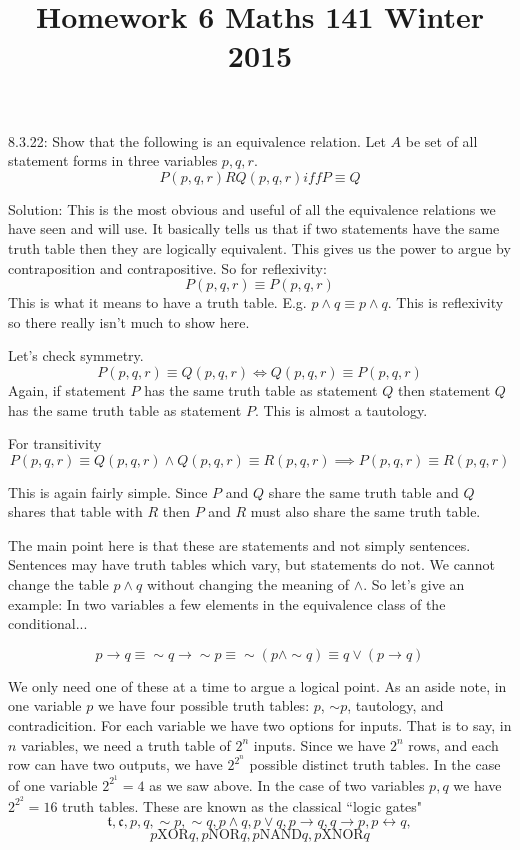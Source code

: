 \documentclass[16 pt]{amsart}
\theoremstyle{definition}
\theoremstyle{remark}
\numberwithin{equation}{subsection}
\begin{document}
\title{Homework 6 Maths 141 Winter 2015}
\maketitle 




8.3.22: Show that the following is an equivalence relation.  Let $A$ be set of all statement forms in three variables $p,q,r.$  
\[
P(p,q,r) R Q(p,q,r) iff P\equiv Q
\]

\vspace{1in}

Solution: This is the most obvious and useful of all the equivalence relations we have seen and will use.  It basically tells us that if two statements have the same truth table then they are logically equivalent.  This  gives us the power to argue by contraposition and contrapositive.  So for reflexivity:
\[
P(p,q,r) \equiv P(p,q,r)
\] 
This is what it means to have a truth table.  E.g. $p\wedge q \equiv p\wedge q$.  This is reflexivity so there really isn't much to show here.

Let's check symmetry.
\[
P(p,q,r) \equiv Q(p,q,r) \iff Q(p,q,r) \equiv P(p,q,r)
\]
Again, if statement $P$ has the same truth table as statement $Q$ then statement $Q$ has the same truth table as statement $P$.  This is almost a tautology.

For transitivity
\[
P(p,q,r) \equiv Q(p,q,r) \wedge Q(p,q,r) \equiv R(p,q,r) \implies P(p,q,r)\equiv R(p,q,r)
\]

This is again fairly simple.  Since $P$ and $Q$ share the same truth table and $Q$ shares that table with $R$ then $P$ and $R$ must also share the same truth table.  

The main point here is that these are statements and not simply sentences.  Sentences may have truth tables which vary, but statements do not.  We cannot change the table $p\wedge q$ without changing the meaning of $\wedge$.  So let's give an example: In two variables a few elements in the equivalence class of the conditional...

\[
p\rightarrow q \equiv \sim q \rightarrow \sim p \equiv \sim(p\wedge \sim q) \equiv q\vee (p\rightarrow q) 
\]

We only need one of these at a time to argue a logical point. As an aside note, in one variable $p$ we have four possible truth tables: $p$, $\sim p$, tautology, and contradicition.
For each variable we have two options for inputs.  That is to say, in $n$ variables, we need a truth table of $2^n$ inputs.  Since we have $2^n$ rows, and each row can have two outputs, we have $2^{2^n}$ possible distinct truth tables.  In the case of one variable $2^{2^1} = 4$ as we saw above.  In the case of two variables $p,q$ we have $2^{2^2}=16$ truth tables.  These are known as the classical ``logic gates"
\[
\mathfrak{t},\mathfrak{c},p,q,\sim p, \sim q,p\wedge q,p\vee q, p\rightarrow q, q\rightarrow p, p\leftrightarrow q,
\] 
\[
p\text{XOR}q, p\text{NOR}q,p\text{NAND}q,p\text{XNOR}q
\]
\end{document}
